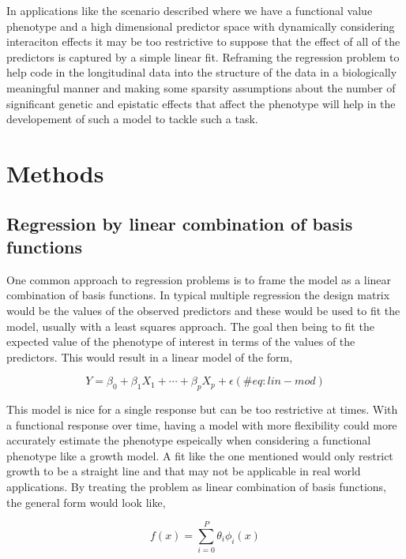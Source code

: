 \documentclass[11pt,]{book}
\theoremstyle{definition}
\theoremstyle{definition}
\theoremstyle{remark}
\begin{document}
In applications like the scenario described where we have a functional
value phenotype and a high dimensional predictor space with dynamically
considering interaciton effects it may be too restrictive to suppose
that the effect of all of the predictors is captured by a simple linear
fit. Reframing the regression problem to help code in the longitudinal
data into the structure of the data in a biologically meaningful manner
and making some sparsity assumptions about the number of significant
genetic and epistatic effects that affect the phenotype will help in the
developement of such a model to tackle such a task.

\section{Methods}\label{methods-2}

\subsection{Regression by linear combination of basis
functions}\label{regression-by-linear-combination-of-basis-functions}

One common approach to regression problems is to frame the model as a
linear combination of basis functions. In typical multiple regression
the design matrix would be the values of the observed predictors and
these would be used to fit the model, usually with a least squares
approach. The goal then being to fit the expected value of the phenotype
of interest in terms of the values of the predictors. This would result
in a linear model of the form,

\begin{equation}
Y = \beta_0 + \beta_1 X_1 + ⋯ + \beta_p X_p + \epsilon
(\#eq: lin-mod)
\end{equation}

This model is nice for a single response but can be too restrictive at
times. With a functional response over time, having a model with more
flexibility could more accurately estimate the phenotype espeically when
considering a functional phenotype like a growth model. A fit like the
one mentioned would only restrict growth to be a straight line and that
may not be applicable in real world applications. By treating the
problem as linear combination of basis functions, the general form would
look like,

\begin{equation}
f(x) = \sum_{i=0}^P \theta_i \phi_i(x)
\label{eq:gen-form}
\end{equation}
\end{document}

